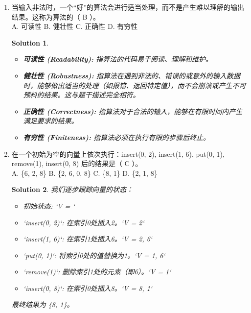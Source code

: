 \documentclass[UTF8]{report}
\newtheorem{solution}{Solution}
\theoremstyle{MyLineTheoremStyle} %
\theoremstyle{MyBlockTheoremStyle} %
\theoremstyle{MySubsubsectionStyle} %
\begin{document}
\begin{enumerate}
    \item 当输入非法时，一个“好”的算法会进行适当处理，而不是产生难以理解的输出结果。这称为算法的（ B ）。\\
    A. 可读性 \quad B. 健壮性 \quad C. 正确性 \quad D. 有穷性
    \begin{solution}
        \begin{itemize}
            \item \textbf{可读性 (Readability):} 指算法的代码易于阅读、理解和维护。
            \item \textbf{健壮性 (Robustness):} 指算法在遇到非法的、错误的或意外的输入数据时，能够做出适当的处理（如报错、返回特定值），而不会崩溃或产生不可预料的结果。这与题干描述完全相符。
            \item \textbf{正确性 (Correctness):} 指算法对于合法的输入，能够在有限时间内产生满足要求的结果。
            \item \textbf{有穷性 (Finiteness):} 指算法必须在执行有限的步骤后终止。
        \end{itemize}
    \end{solution}

    \item 在一个初始为空的向量上依次执行：insert(0, 2), insert(1, 6), put(0, 1), remove(1), insert(0, 8) 后的结果是（ C ）。\\
    A. \{6, 2, 8\} \quad B. \{2, 6, 0, 8\} \quad C. \{8, 1\} \quad D. \{2, 1, 8\}
    \begin{solution}
        我们逐步跟踪向量的状态：
        \begin{itemize}
            \item 初始状态: `V = {}`
            \item `insert(0, 2)`: 在索引0处插入2。`V = {2}`
            \item `insert(1, 6)`: 在索引1处插入6。`V = {2, 6}`
            \item `put(0, 1)`: 将索引0处的值替换为1。`V = {1, 6}`
            \item `remove(1)`: 删除索引1处的元素（即6）。`V = {1}`
            \item `insert(0, 8)`: 在索引0处插入8。`V = {8, 1}`
        \end{itemize}
        最终结果为 \{8, 1\}。
    \end{solution}


\end{enumerate}
\end{document}
